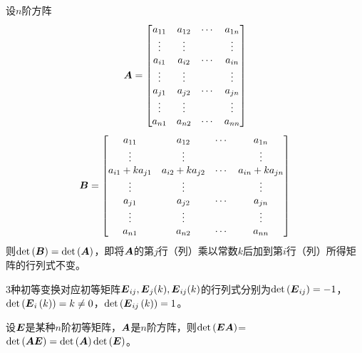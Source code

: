 \documentclass{ctexart}
\begin{document}
\begin{property}
    设\(n\)阶方阵
    \begin{equation*}
        \boldsymbol{A}=\begin{bmatrix}
            a_{11} & a_{12} & \cdots & a_{1n} \\
            \vdots & \vdots &        & \vdots \\
            a_{i1} & a_{i2} & \cdots & a_{in} \\
            \vdots & \vdots &        & \vdots \\
            a_{j1} & a_{j2} & \cdots & a_{jn} \\
            \vdots & \vdots &        & \vdots \\
            a_{n1} & a_{n2} & \cdots & a_{nn}
        \end{bmatrix}
    \end{equation*}
    \begin{equation*}
        \boldsymbol{B}=\begin{bmatrix}
            a_{11}         & a_{12}         & \cdots & a_{1n}         \\
            \vdots         & \vdots         &        & \vdots         \\
            a_{i1}+ka_{j1} & a_{i2}+ka_{j2} & \cdots & a_{in}+ka_{jn} \\
            \vdots         & \vdots         &        & \vdots         \\
            a_{j1}         & a_{j2}         & \cdots & a_{jn}         \\
            \vdots         & \vdots         &        & \vdots         \\
            a_{n1}         & a_{n2}         & \cdots & a_{nn}
        \end{bmatrix}
    \end{equation*}
    则\(\mathrm{det}\left( \boldsymbol{B} \right)=\mathrm{det}\left( \boldsymbol{A} \right)\)，即将\(\boldsymbol{A}\)的第\(j\)行（列）乘以常数\(k\)后加到第\(i\)行（列）所得矩阵的行列式不变。
\end{property}

\begin{infer}
    3种初等变换对应初等矩阵\(\boldsymbol{E}_{ij},\boldsymbol{E}_j(k),\boldsymbol{E}_{ij}(k)\)的行列式分别为\(\mathrm{det}\left( \boldsymbol{E}_{ij} \right)=-1\)，\(\mathrm{det}\left( \boldsymbol{E}_i\left( k \right) \right)=k\neq0\)，\(\mathrm{det}\left( \boldsymbol{E}_{ij}\left( k \right) \right)=1\)。
\end{infer}

\begin{infer}
    设\(\boldsymbol{E}\)是某种\(n\)阶初等矩阵，\(\boldsymbol{A}\)是\(n\)阶方阵，则\(\mathrm{det}\left( \boldsymbol{E}\boldsymbol{A} \right)\)=\(\mathrm{det}\left( \boldsymbol{A}\boldsymbol{E} \right)=\mathrm{det}\left( \boldsymbol{A} \right)\mathrm{det}\left( \boldsymbol{E} \right)\)。
\end{infer}
\end{document}
